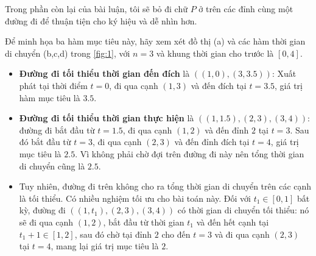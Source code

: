 \documentclass[../main.tex]{subfiles}
\begin{document}
Trong phần còn lại của bài luận, tôi sẽ bỏ đi chữ \(P\) ở trên các đỉnh cùng một đường đi để thuận tiện cho ký hiệu và dễ nhìn
hơn.

Để minh họa ba hàm mục tiêu này, hãy xem xét đồ thị (a) và các hàm thời
gian di chuyển (b,c,d) trong \autoref{fig:1}, với \(n = 3\) và khung thời gian
cho trước là \([0, 4]\).

\begin{itemize}
\tightlist
\item
  \textbf{Đường đi tối thiểu thời gian đến đích} là
  \(((1, 0), (3, 3.5))\): Xuất phát tại thời điểm \(t = 0\), đi qua cạnh
  \((1, 3)\) và đến đích tại \(t = 3.5\), giá trị hàm mục tiêu là
  \(3.5\).
\item
  \textbf{Đường đi tối thiểu thời gian thực hiện} là
  \(((1, 1.5), (2, 3), (3, 4))\): đường đi bắt đầu từ \(t = 1.5\), đi
  qua cạnh \((1, 2)\) và đến đỉnh \(2\) tại \(t = 3\). Sau đó bắt đầu từ
  \(t = 3\), đi qua cạnh \((2, 3)\) và đến đỉnh đích tại \(t = 4\), giá
  trị mục tiêu là \(2.5\). Vì không phải chờ đợi trên đường đi này nên
  tổng thời gian di chuyển cũng là \(2.5\).
\item
  Tuy nhiên, đường đi trên không cho ra tổng thời gian di chuyển trên
  các cạnh là tối thiểu. Có nhiều nghiệm tối ưu cho bài toán này. Đối
  với \(t_1 \in [0, 1]\) bất kỳ, đường đi \(((1, t_1), (2, 3), (3, 4))\)
  có thời gian di chuyển tối thiểu: nó sẽ đi qua cạnh \((1, 2)\), bắt
  đầu từ thời gian \(t_1\) và đến hết cạnh tại \(t_1 + 1 \in [1, 2]\),
  sau đó chờ tại đỉnh \(2\) cho đến \(t = 3\) và đi qua cạnh \((2, 3)\)
  tại \(t = 4\), mang lại giá trị mục tiêu là \(2\).
\end{itemize}
\end{document}

